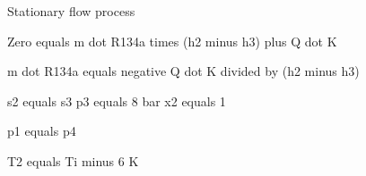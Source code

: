Stationary flow process  

Zero equals m dot R134a times (h2 minus h3) plus Q dot K  

m dot R134a equals negative Q dot K divided by (h2 minus h3)  

s2 equals s3  
p3 equals 8 bar  
x2 equals 1  

p1 equals p4  

T2 equals Ti minus 6 K
